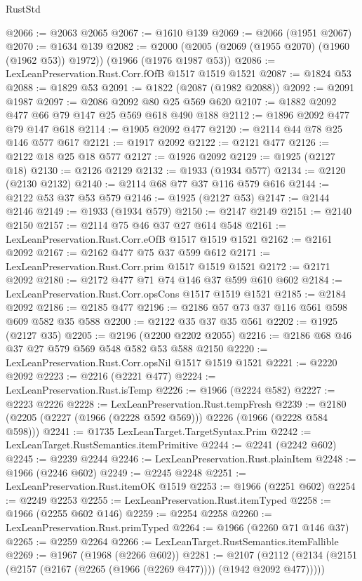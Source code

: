 \begin{lexlean}{RustStd}
\begin{coremodule}
@2066 := @2063 @2065
@2067 := @1610 @139
@2069 := @2066 (@1951 @2067)
@2070 := @1634 @139
@2082 := @2000 (@2005 (@2069 (@1955 @2070) (@1960 (@1962 @53)) @1972)) (@1966 (@1976 @1987 @53))
@2086 := LexLeanPreservation.Rust.Corr.fOfB @1517 @1519 @1521
@2087 := @1824 @53
@2088 := @1829 @53
@2091 := @1822 (@2087 (@1982 @2088))
@2092 := @2091 @1987
@2097 := @2086 @2092 @80 @25 @569 @620
@2107 := @1882 @2092 @477 @66 @79 @147 @25 @569 @618 @490 @188
@2112 := @1896 @2092 @477 @79 @147 @618
@2114 := @1905 @2092 @477
@2120 := @2114 @44 @78 @25 @146 @577 @617
@2121 := @1917 @2092
@2122 := @2121 @477
@2126 := @2122 @18 @25 @18 @577
@2127 := @1926 @2092
@2129 := @1925 (@2127 @18)
@2130 := @2126 @2129
@2132 := @1933 (@1934 @577)
@2134 := @2120 (@2130 @2132)
@2140 := @2114 @68 @77 @37 @116 @579 @616
@2144 := @2122 @53 @37 @53 @579
@2146 := @1925 (@2127 @53)
@2147 := @2144 @2146
@2149 := @1933 (@1934 @579)
@2150 := @2147 @2149
@2151 := @2140 @2150
@2157 := @2114 @75 @46 @37 @27 @614 @548
@2161 := LexLeanPreservation.Rust.Corr.eOfB @1517 @1519 @1521
@2162 := @2161 @2092
@2167 := @2162 @477 @75 @37 @599 @612
@2171 := LexLeanPreservation.Rust.Corr.prim @1517 @1519 @1521
@2172 := @2171 @2092
@2180 := @2172 @477 @71 @74 @146 @37 @599 @610 @602
@2184 := LexLeanPreservation.Rust.Corr.opsCons @1517 @1519 @1521
@2185 := @2184 @2092
@2186 := @2185 @477
@2196 := @2186 @57 @73 @37 @116 @561 @598 @609 @582 @35 @588
@2200 := @2122 @35 @37 @35 @561
@2202 := @1925 (@2127 @35)
@2205 := @2196 (@2200 @2202 @2055)
@2216 := @2186 @68 @46 @37 @27 @579 @569 @548 @582 @53 @588 @2150
@2220 := LexLeanPreservation.Rust.Corr.opsNil @1517 @1519 @1521
@2221 := @2220 @2092
@2223 := @2216 (@2221 @477)
@2224 := LexLeanPreservation.Rust.isTemp
@2226 := @1966 (@2224 @582)
@2227 := @2223 @2226
@2228 := LexLeanPreservation.Rust.tempFresh
@2239 := @2180 (@2205 (@2227 (@1966 (@2228 @592 @569))) @2226 (@1966 (@2228 @584 @598)))
@2241 := @1735 LexLeanTarget.TargetSyntax.Prim
@2242 := LexLeanTarget.RustSemantics.itemPrimitive
@2244 := @2241 (@2242 @602)
@2245 := @2239 @2244
@2246 := LexLeanPreservation.Rust.plainItem
@2248 := @1966 (@2246 @602)
@2249 := @2245 @2248
@2251 := LexLeanPreservation.Rust.itemOK @1519
@2253 := @1966 (@2251 @602)
@2254 := @2249 @2253
@2255 := LexLeanPreservation.Rust.itemTyped
@2258 := @1966 (@2255 @602 @146)
@2259 := @2254 @2258
@2260 := LexLeanPreservation.Rust.primTyped
@2264 := @1966 (@2260 @71 @146 @37)
@2265 := @2259 @2264
@2266 := LexLeanTarget.RustSemantics.itemFallible
@2269 := @1967 (@1968 (@2266 @602))
@2281 := @2107
    (@2112 (@2134 (@2151 (@2157 (@2167 (@2265 (@1966 (@2269 @477)))) (@1942 @2092 @477)))))

\end{coremodule}
\end{lexlean}
